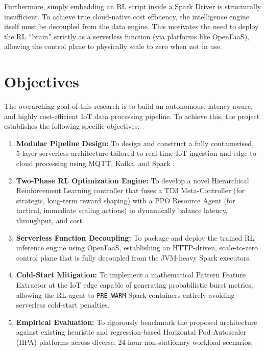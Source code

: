 Furthermore, simply embedding an RL script inside a Spark Driver is structurally insufficient. To achieve true cloud-native cost efficiency, the intelligence engine itself must be decoupled from the data engine. This motivates the need to deploy the RL ``brain'' strictly as a serverless function (via platforms like OpenFaaS), allowing the control plane to physically scale to zero when not in use.

\section{Objectives}

The overarching goal of this research is to build an autonomous, latency-aware, and highly cost-efficient IoT data processing pipeline. To achieve this, the project establishes the following specific objectives:

\begin{enumerate}
  \item \textbf{Modular Pipeline Design:} To design and construct a fully containerised, 5-layer serverless architecture tailored to real-time IoT ingestion and edge-to-cloud processing using MQTT, Kafka, and Spark \cite{werner2024reference}.
  
  \item \textbf{Two-Phase RL Optimization Engine:} To develop a novel Hierarchical Reinforcement Learning controller that fuses a TD3 Meta-Controller (for strategic, long-term reward shaping) with a PPO Resource Agent (for tactical, immediate scaling actions) to dynamically balance latency, throughput, and cost.
  
  \item \textbf{Serverless Function Decoupling:} To package and deploy the trained RL inference engine using OpenFaaS, establishing an HTTP-driven, scale-to-zero control plane that is fully decoupled from the JVM-heavy Spark executors.
  
  \item \textbf{Cold-Start Mitigation:} To implement a mathematical Pattern Feature Extractor at the IoT edge capable of generating probabilistic burst metrics, allowing the RL agent to \texttt{PRE\_WARM} Spark containers entirely avoiding serverless cold-start penalties.
  
  \item \textbf{Empirical Evaluation:} To rigorously benchmark the proposed architecture against existing heuristic and regression-based Horizontal Pod Autoscaler (HPA) platforms \cite{nestorov2024dexter} across diverse, 24-hour non-stationary workload scenarios.
\end{enumerate}

